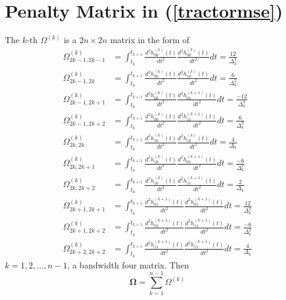 


\section{Penalty Matrix in (\ref{tractormse})}\label{PenaltyTermDetails}

The $k$-th $\Omega^{(k)}$ is a $2n \times 2n$ matrix in the form of
\begin{align}
\Omega_{2k-1,2k-1}^{(k)} & =\int_{t_{k}}^{t_{k+1}} \frac{d^2 h_{00}^{(k)}(t)}{dt^2}  \frac{d^2 h_{00}^{(k)}(t)}{dt^2} dt=\frac{12}{\Delta_k^3}\\
\Omega_{2k-1,2k}^{(k)} &=\int_{t_{k}}^{t_{k+1}} \frac{d^2 h_{00}^{(k)}(t)}{dt^2}  \frac{d^2 h_{10}^{(k)}(t)}{dt^2} dt=\frac{6}{\Delta_k^2}\\
\Omega_{2k-1,2k+1}^{(k)} &=\int_{t_{k}}^{t_{k+1}} \frac{d^2 h_{00}^{(k)}(t)}{dt^2}  \frac{d^2 h_{01}^{(k+1)}(t)}{dt^2} dt=\frac{-12}{\Delta_k^3}\\
\Omega_{2k-1,2k+2}^{(k)} &=\int_{t_{k}}^{t_{k+1}} \frac{d^2 h_{00}^{(k)}(t)}{dt^2}  \frac{d^2 h_{11}^{(k+1)}(t)}{dt^2} dt=\frac{6}{\Delta_k^2}\\
\Omega_{2k,2k}^{(k)} &=\int_{t_{k}}^{t_{k+1}} \frac{d^2 h_{10}^{(k)}(t)}{dt^2}  \frac{d^2 h_{10}^{(k)}(t)}{dt^2} dt=\frac{4}{\Delta_k} \\
\Omega_{2k,2k+1}^{(k)} &=\int_{t_{k}}^{t_{k+1}} \frac{d^2 h_{10}^{(k)}(t)}{dt^2}  \frac{d^2 h_{01}^{(k+1)}(t)}{dt^2} dt=\frac{-6}{\Delta_k^2}\\
\Omega_{2k,2k+2}^{(k)} &=\int_{t_{k}}^{t_{k+1}} \frac{d^2 h_{10}^{(k)}(t)}{dt^2}  \frac{d^2 h_{11}^{(k+1)}(t)}{dt^2} dt=\frac{2}{\Delta_k}\\
\Omega_{2k+1,2k+1}^{(k)} &=\int_{t_{k}}^{t_{k+1}} \frac{d^2 h_{01}^{(k+1)}(t)}{dt^2}  \frac{d^2 h_{01}^{(k+1)}(t)}{dt^2} dt=\frac{12}{\Delta_k^3}\\
\Omega_{2k+1,2k+2}^{(k)} &=\int_{t_{k}}^{t_{k+1}} \frac{d^2 h_{01}^{(k+1)}(t)}{dt^2}  \frac{d^2 h_{11}^{(k+1)}(t)}{dt^2} dt=\frac{-6}{\Delta_k^2}\\
\Omega_{2k+2,2k+2}^{(k)} &=\int_{t_{k}}^{t_{k+1}} \frac{d^2 h_{11}^{(k+1)}(t)}{dt^2}  \frac{d^2 h_{11}^{(k+1)}(t)}{dt^2} dt=\frac{4}{\Delta_k}
\end{align}
$k=1,2,\ldots,n-1$, a bandwidth four matrix. Then 
\begin{equation*}
\mathbf{\Omega}=\sum_{k=1}^{n-1}\Omega^{(k)}
\end{equation*}



